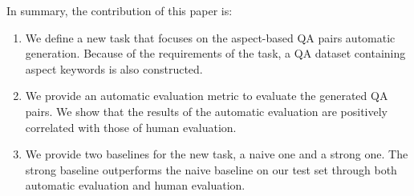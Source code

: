 


In summary, the contribution of this paper is:
\begin{enumerate}
\item We define a new task that focuses on the aspect-based QA pairs automatic generation.  Because of the requirements of the task, a  QA dataset containing aspect keywords is also constructed.
\item We provide an automatic evaluation metric to evaluate the generated QA pairs. We show that the results of the automatic evaluation are positively correlated with those of human evaluation.
\item We provide two baselines for the new task, a naive one and a strong one. The strong baseline outperforms the naive baseline on our test set through both automatic evaluation and human evaluation.
\end{enumerate}

